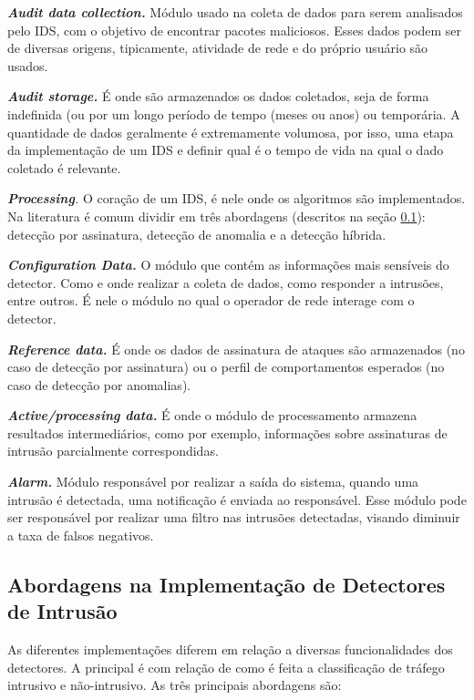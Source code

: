 
\textbf{\textit{Audit data collection.}} Módulo usado na coleta de dados para serem analisados pelo IDS, com o objetivo de encontrar pacotes maliciosos. Esses dados podem ser de diversas origens, tipicamente, atividade de rede e do próprio usuário são usados.

\textbf{\textit{Audit storage.}} É onde são armazenados os dados coletados, seja de forma indefinida (ou por um longo período de tempo (meses ou anos) ou temporária. A quantidade de dados geralmente é extremamente volumosa, por isso, uma etapa da implementação de um IDS e definir qual é o tempo de vida na qual o dado coletado é relevante.

\textit{\textbf{Processing}.} O coração de um IDS, é nele onde os algoritmos são implementados. Na literatura é comum dividir em três abordagens (descritos na seção \ref{ids:tipos}): detecção por assinatura, detecção de anomalia e a detecção híbrida.

\textit{\textbf{Configuration Data.}} O módulo que contém as informações mais sensíveis do detector. Como e onde realizar a coleta de dados, como responder a intrusões, entre outros. É nele o módulo no qual o operador de rede interage com o detector.

\textit{\textbf{Reference data.}} É onde os dados de assinatura de ataques são armazenados (no caso de detecção por assinatura) ou o perfil de comportamentos esperados (no caso de detecção por anomalias). 

\textbf{\textit{Active/processing data.}} É onde o módulo de processamento armazena resultados intermediários, como por exemplo, informações sobre assinaturas de intrusão parcialmente correspondidas.

\textbf{\textit{Alarm.}} Módulo responsável por realizar a saída do sistema, quando uma intrusão é detectada, uma notificação é enviada ao responsável. Esse módulo pode ser responsável por realizar uma filtro nas intrusões detectadas, visando diminuir a taxa de falsos negativos.

\subsection{Abordagens na Implementação de Detectores de Intrusão}
\label{ids:tipos}
As diferentes implementações diferem em relação a diversas funcionalidades dos detectores. A principal é com relação de como é feita a classificação de tráfego intrusivo e não-intrusivo. As três principais abordagens são:


